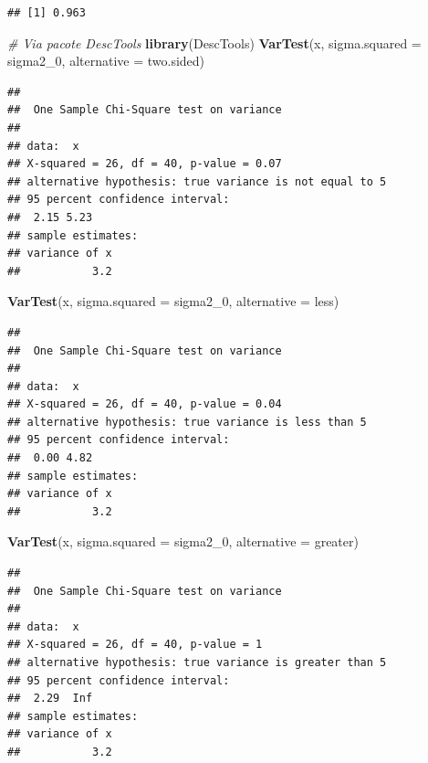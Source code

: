 \documentclass[
]{book}
\newenvironment{Shaded}{\begin{snugshade}}{\end{snugshade}}
\newcommand{\CommentTok}[1]{\textcolor[rgb]{0.56,0.35,0.01}{\textit{#1}}}
\newcommand{\DataTypeTok}[1]{\textcolor[rgb]{0.13,0.29,0.53}{#1}}
\newcommand{\DecValTok}[1]{\textcolor[rgb]{0.00,0.00,0.81}{#1}}
\newcommand{\KeywordTok}[1]{\textcolor[rgb]{0.13,0.29,0.53}{\textbf{#1}}}
\newcommand{\NormalTok}[1]{#1}
\newcommand{\StringTok}[1]{\textcolor[rgb]{0.31,0.60,0.02}{#1}}
\theoremstyle{definition}
\theoremstyle{definition}
\theoremstyle{definition}
\theoremstyle{remark}
\begin{document}
\begin{verbatim}
## [1] 0.963
\end{verbatim}

\begin{Shaded}
\begin{Highlighting}[]
\CommentTok{\# Via pacote DescTools}
\KeywordTok{library}\NormalTok{(DescTools)}
\KeywordTok{VarTest}\NormalTok{(x, }\DataTypeTok{sigma.squared =}\NormalTok{ sigma2\_}\DecValTok{0}\NormalTok{, }\DataTypeTok{alternative =} \StringTok{\textquotesingle{}two.sided\textquotesingle{}}\NormalTok{)}
\end{Highlighting}
\end{Shaded}

\begin{verbatim}
## 
##  One Sample Chi-Square test on variance
## 
## data:  x
## X-squared = 26, df = 40, p-value = 0.07
## alternative hypothesis: true variance is not equal to 5
## 95 percent confidence interval:
##  2.15 5.23
## sample estimates:
## variance of x 
##           3.2
\end{verbatim}

\begin{Shaded}
\begin{Highlighting}[]
\KeywordTok{VarTest}\NormalTok{(x, }\DataTypeTok{sigma.squared =}\NormalTok{ sigma2\_}\DecValTok{0}\NormalTok{, }\DataTypeTok{alternative =} \StringTok{\textquotesingle{}less\textquotesingle{}}\NormalTok{)}
\end{Highlighting}
\end{Shaded}

\begin{verbatim}
## 
##  One Sample Chi-Square test on variance
## 
## data:  x
## X-squared = 26, df = 40, p-value = 0.04
## alternative hypothesis: true variance is less than 5
## 95 percent confidence interval:
##  0.00 4.82
## sample estimates:
## variance of x 
##           3.2
\end{verbatim}

\begin{Shaded}
\begin{Highlighting}[]
\KeywordTok{VarTest}\NormalTok{(x, }\DataTypeTok{sigma.squared =}\NormalTok{ sigma2\_}\DecValTok{0}\NormalTok{, }\DataTypeTok{alternative =} \StringTok{\textquotesingle{}greater\textquotesingle{}}\NormalTok{)}
\end{Highlighting}
\end{Shaded}

\begin{verbatim}
## 
##  One Sample Chi-Square test on variance
## 
## data:  x
## X-squared = 26, df = 40, p-value = 1
## alternative hypothesis: true variance is greater than 5
## 95 percent confidence interval:
##  2.29  Inf
## sample estimates:
## variance of x 
##           3.2
\end{verbatim}
\end{document}
